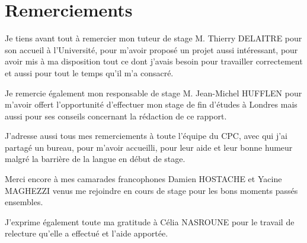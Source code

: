 \chapter*{Remerciements}

Je tiens avant tout \`a remercier mon tuteur de stage M. Thierry DELAITRE pour son accueil \`a l'Universit\'e, pour m'avoir propos\'e un projet aussi int\'eressant, pour avoir mis \`a ma disposition tout ce dont j'avais besoin pour travailler correctement et aussi pour tout le temps qu'il m'a consacr\'e.

Je remercie \'egalement mon responsable de stage M. Jean-Michel HUFFLEN pour m'avoir offert l'opportunit\'e d'effectuer mon stage de fin d'\'etudes \`a Londres mais aussi pour ses conseils concernant la r\'edaction de ce rapport.

J'adresse aussi tous mes remerciements \`a toute l'\'equipe du CPC, avec qui j'ai partag\'e un bureau, pour m'avoir accueilli, pour leur aide et leur bonne humeur malgr\'e la barri\`ere de la langue en d\'ebut de stage.

Merci encore \`a mes camarades francophones Damien HOSTACHE et Yacine MAGHEZZI venus me rejoindre en cours de stage pour les bons moments pass\'es ensembles.

J'exprime \'egalement toute ma gratitude \`a C\'elia NASROUNE pour le travail de relecture qu'elle a effectu\'e et l'aide apport\'ee.

\clearpage
